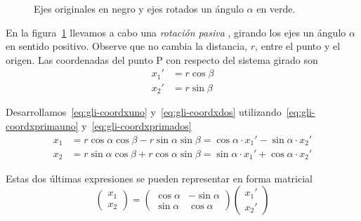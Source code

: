 \begin{figure}[ht]
\begin{minipage}{0.45\linewidth}
    \caption{Ejes originales en negro y ejes rotados un ángulo $\alpha$ en verde.}
    \label{fig:gli-rotated-axes}
  \end{minipage}
\end{figure}

En la figura~\ref{fig:gli-rotated-axes} llevamos a cabo una \emph{rotación pasiva} \footnotemark{}, girando los ejes un ángulo $\alpha$ en sentido positivo.
Observe que no cambia la distancia, $r$, entre el punto y el origen.
Las coordenadas del punto P con respecto del sistema girado son
\begin{subequations}
  \begin{align}\label{eq:gli-coordxprimauno}
    x_1' &= r \cos\beta\\
    \label{eq:gli-coordxprimados}
    x_2' &= r \sin\beta
  \end{align}
\end{subequations}

Desarrollamos~\eqref{eq:gli-coordxuno} y~\eqref{eq:gli-coordxdos} utilizando~\eqref{eq:gli-coordxprimauno} y~\eqref{eq:gli-coordxprimados}
\begin{align*}
  x_1 &= r \cos\alpha \cos\beta - r \sin\alpha \sin\beta
  = \cos\alpha\cdot x_1' - \sin\alpha \cdot x_2'\\
  x_2 &= r \sin\alpha \cos\beta + r \cos\alpha \sin\beta
        = \sin\alpha \cdot x_1' + \cos\alpha \cdot  x_2'
\end{align*}

Estas dos últimas expresiones se pueden representar en forma matricial
\[
  \begin{pmatrix}
    x_1 \\ x_2
  \end{pmatrix}
  =
  \begin{pmatrix}
    \cos\alpha & -\sin\alpha\\ \sin\alpha & \cos\alpha
  \end{pmatrix}
  \begin{pmatrix}
    x_1' \\ x_2'
  \end{pmatrix}
\]


